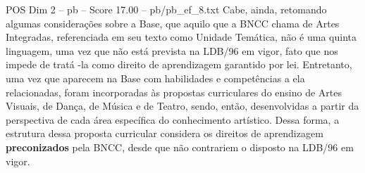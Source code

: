 \begin{textsample}{POS Dim 2 – pb – Score 17.00 – pb/pb\_ef\_8.txt}
Cabe, ainda, retomando algumas considerações sobre a Base, que aquilo que a BNCC chama de Artes Integradas, referenciada em seu texto como Unidade Temática, não é uma quinta linguagem, uma vez que não está prevista na LDB/96 em vigor, fato que nos impede de tratá -la como direito de aprendizagem garantido por lei.
Entretanto, uma vez que aparecem na Base com habilidades e competências a ela relacionadas, foram incorporadas às propostas curriculares do ensino de Artes Visuais, de Dança, de Música e de Teatro, sendo, então, desenvolvidas a partir da perspectiva de cada área específica do conhecimento artístico.
Dessa forma, a estrutura dessa proposta curricular considera os direitos de aprendizagem \textbf{preconizados} pela BNCC, desde que não contrariem o disposto na LDB/96 em vigor.

\end{textsample}
